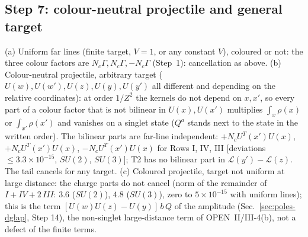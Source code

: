 \subsection{Step 7: colour-neutral projectile and general target}
\noindent [N, \texttt{t2}] (a) Uniform far lines (finite target, $V=1$, or any constant $V$), coloured or not: the three colour factors are $N_{c}\Gamma,N_{c}\Gamma,-N_{c}\Gamma$ (Step~1): cancellation as above. (b) Colour-neutral projectile, arbitrary target ($U(w),U(w'),U(z),U(y),U(y')$ all different and depending on the relative coordinates): at order $1/Z^{2}$ the kernels do not depend on $x,x'$, so every part of a colour factor that is not bilinear in $U(x),U(x')$ multiplies $\int_{x}\rho(x)$ or $\int_{x'}\rho(x')$ and vanishes on a singlet state ($Q^{a}$ stands next to the state in the written order). The bilinear parts are far-line independent: $+N_{c}U^{T}(x')U(x)$, $+N_{c}U^{T}(x')U(x)$, $-N_{c}U^{T}(x')U(x)$ for Rows I, IV, III [deviations $\le3.3\times10^{-15}$, $SU(2)$, $SU(3)$]; T2 has no bilinear part in $\mathcal{L}(y')-\mathcal{L}(z)$. The tail cancels for any target. (c) Coloured projectile, target not uniform at large distance: the charge parts do not cancel (norm of the remainder of $I+IV+2\,III$: $3.6$ ($SU(2)$), $4.8$ ($SU(3)$), zero to $5\times10^{-15}$ with uniform lines); this is the term $[U(w)U(z)-U(y)]\,b\,Q$ of the amplitude (Sec.~\ref{sec:poles-dglap}, Step 14), the non-singlet large-distance term of OPEN~II/III-4(b), not a defect of the finite terms.

